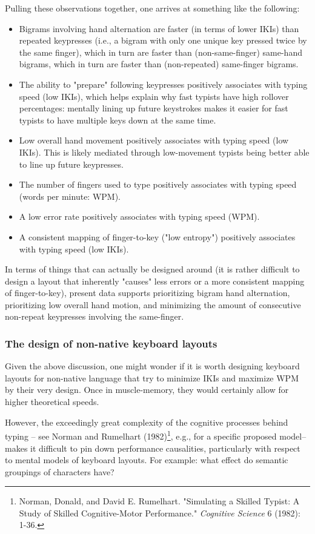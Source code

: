 \documentclass[11pt]{article}
\begin{document}
Pulling these observations together, one arrives at something like the following:

\begin{itemize}
\item Bigrams involving hand alternation are faster (in terms of lower IKIs) than repeated keypresses (i.e., a bigram with only one unique key pressed twice by the same finger), which in turn are faster than (non-same-finger) same-hand bigrams, which in turn are faster than (non-repeated) same-finger bigrams.
\item The ability to "prepare" following keypresses positively associates with typing speed (low IKIs), which helps explain why fast typists have high rollover percentages: mentally lining up future keystrokes makes it easier for fast typists to have multiple keys down at the same time.
\item Low overall hand movement positively associates with typing speed (low IKIs). This is likely mediated through low-movement typists being better able to line up future keypresses.
\item The number of fingers used to type positively associates with typing speed (words per minute: WPM).
\item A low error rate positively associates with typing speed (WPM).
\item A consistent mapping of finger-to-key ("low entropy") positively associates with typing speed (low IKIs).
\end{itemize}

In terms of things that can actually be designed around (it is rather difficult to design a layout that inherently "causes" less errors or a more consistent mapping of finger-to-key), present data supports prioritizing bigram hand alternation, prioritizing low overall hand motion, and minimizing the amount of consecutive non-repeat keypresses involving the same-finger.

\subsubsection{The design of non-native keyboard layouts}
\label{sec:org8eae422}

Given the above discussion, one might wonder if it is worth designing keyboard layouts for non-native language that try to minimize IKIs and maximize WPM by their very design. Once in muscle-memory, they would certainly allow for higher theoretical speeds.

However, the exceedingly great complexity of the cognitive processes behind typing -- see Norman and Rumelhart (1982)\footnote{Norman, Donald, and David E. Rumelhart. "Simulating a Skilled Typist: A Study of Skilled Cognitive-Motor Performance." \emph{Cognitive Science} 6 (1982): 1-36.}, e.g., for a specific proposed model-- makes it difficult to pin down performance causalities, particularly with respect to mental models of keyboard layouts. For example: what effect do semantic groupings of characters have?
\end{document}
